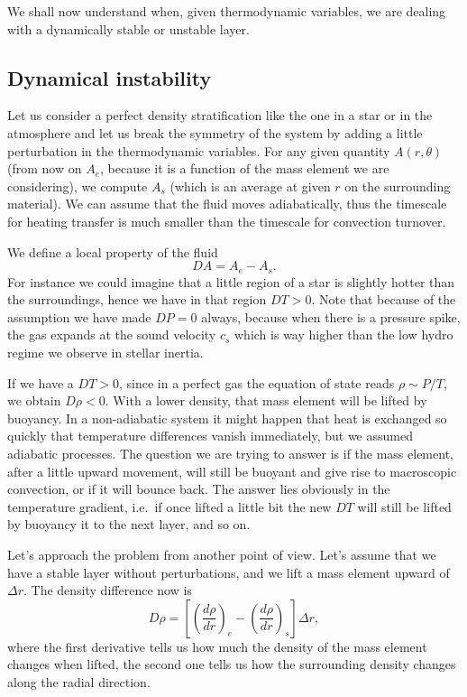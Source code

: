 We shall now understand when, given thermodynamic variables, we are dealing with a dynamically stable or unstable layer.


\subsection{Dynamical instability}
Let us consider a perfect density stratification like the one in a star or in the atmosphere and let us break the symmetry of the system by adding a little perturbation in the thermodynamic variables. For any given quantity $A(r, \theta)$ (from now on $A_e$, because it is a function of the mass element we are considering), we compute $A_s$ (which is an average at given $r$ on the surrounding material). We can assume that the fluid moves adiabatically, thus the timescale for heating transfer is much smaller than the timescale for convection turnover. 

We define a local property of the fluid 
$$
DA=A_e - A_s.
$$
For instance we could imagine that a little region of a star is slightly hotter than the surroundings, hence we have in that region $DT > 0$. Note that because of the assumption we have made $DP=0$ always, because when there is a pressure spike, the gas expands at the sound velocity $c_s$ which is way higher than the low hydro regime we observe in stellar inertia.

If we have a $DT>0$, since in a perfect gas the equation of state reads $\rho \sim P/T$, we obtain $D \rho < 0$. With a lower density, that mass element will be lifted by buoyancy. In a non-adiabatic system it might happen that heat is exchanged so quickly that temperature differences vanish immediately, but we assumed adiabatic processes. The question we are trying to answer is if the mass element, after a little upward movement, will still be buoyant and give rise to macroscopic convection, or if it will bounce back. The answer lies obviously in the temperature gradient, i.e.\ if once lifted a little bit the new $DT$ will still be lifted by buoyancy it to the next layer, and so on. 

Let's approach the problem from another point of view. Let's assume that we have a stable layer without perturbations, and we lift a mass element upward of $\Delta r$. The density difference now is
\begin{equation}\label{eq:displacement}
D \rho = \left [  \left( \frac{d \rho}{d r} \right)_e - \left( \frac{d \rho}{d r} \right)_s   \right ] \Delta r,
\end{equation}
where the first derivative tells us how much the density of the mass element changes when lifted, the second one tells us how the surrounding density changes along the radial direction. 

